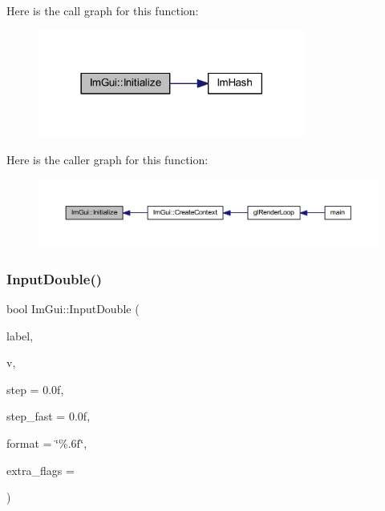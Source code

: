 Here is the call graph for this function\+:
\nopagebreak
\begin{figure}[H]
\begin{center}
\leavevmode
\includegraphics[width=249pt]{namespace_im_gui_a2e1fd6aabbb02f367fd6aee248506782_cgraph}
\end{center}
\end{figure}
Here is the caller graph for this function\+:
\nopagebreak
\begin{figure}[H]
\begin{center}
\leavevmode
\includegraphics[width=350pt]{namespace_im_gui_a2e1fd6aabbb02f367fd6aee248506782_icgraph}
\end{center}
\end{figure}
\mbox{\label{namespace_im_gui_a1c3c95609588b324e21ce0c7a549025f}} 
\subsubsection{\texorpdfstring{Input\+Double()}{InputDouble()}}
{\footnotesize\ttfamily bool Im\+Gui\+::\+Input\+Double (\begin{DoxyParamCaption}\item[{const char $\ast$}]{label,  }\item[{double $\ast$}]{v,  }\item[{double}]{step = {\ttfamily 0.0f},  }\item[{double}]{step\+\_\+fast = {\ttfamily 0.0f},  }\item[{const char $\ast$}]{format = {\ttfamily \char`\"{}\%.6f\char`\"{}},  }\item[{\mbox{\hyperlink{imgui_8h_a7d2c6153a6b9b5d3178ce82434ac9fb8}{Im\+Gui\+Input\+Text\+Flags}}}]{extra\+\_\+flags = {} }\end{DoxyParamCaption})}

